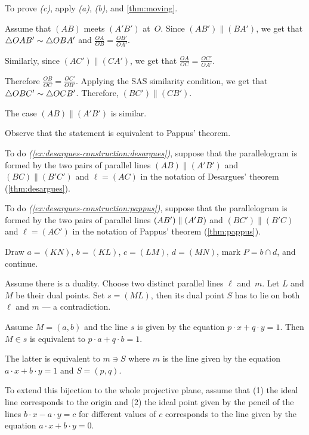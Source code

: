 \begin{multicols}{2}
To prove \textit{(c)}, apply \textit{(a)}, \textit{(b)}, and \ref{thm:moving}.

Assume that $(AB)$ meets $(A'B')$ at~$O$.
Since $(AB')\parallel (BA')$, we get that $\triangle OAB'\z\sim\triangle OBA'$
and
$\frac{OA}{OB}=\frac{OB'}{OA'}$.

Similarly, since $(AC')\parallel (CA')$, we get that
$\frac{OA}{OC}=\frac{OC'}{OA'}$.

Therefore
$\frac{OB}{OC}=\frac{OC'}{OB'}$.
Applying the SAS similarity condition, we get that
$\triangle OBC'\z\sim\triangle OCB'$.
Therefore, $(BC')\parallel (CB')$.

The case $(AB)\parallel(A'B')$ is similar.

 Observe that the statement is equivalent to Pappus' theorem.

To do \textit{(\ref{ex:desargues-construction:desargues})}, 
suppose that the parallelogram is formed by the two pairs of parallel lines $(AB)\parallel (A'B')$ and $(BC)\parallel(B'C')$ and $\ell=(AC)$ in the notation of Desargues' theorem (\ref{thm:desargues}).

To do \textit{(\ref{ex:desargues-construction:pappus})}, suppose that the parallelogram is formed by the two pairs of parallel lines $(AB')\z\parallel (A'B)$ and $(BC')\parallel(B'C)$ and $\ell=(AC')$ in the notation of Pappus' theorem (\ref{thm:pappus}).

Draw $a=(KN)$, $b=(KL)$, $c=(LM)$, $d=(MN)$, mark $P=b\cap d$, and continue. 

Assume there is a duality.
Choose two distinct parallel lines $\ell$ and~$m$.
Let $L$ and $M$ be their dual points.
Set $s=(ML)$, then its dual point $S$ has to lie on both $\ell$ and $m$ --- a contradiction.

Assume $M=(a,b)$ 
and the line $s$ is given by the equation $p\cdot x+q\cdot y=1$.
Then $M\in s$ is equivalent to $p\cdot a+q\cdot b=1$.

The latter is equivalent to $m\ni S$
where $m$ is the line given by the equation 
$a\cdot x+b\cdot y=1$ and $S=(p,q)$.

To extend this bijection to the whole projective plane, assume that 
(1) the ideal line corresponds to the origin 
and (2) the ideal point given by the pencil of the lines $b\cdot x-a\cdot y=c$ for different values of $c$ corresponds to the line given by the equation $a\cdot x+b\cdot y=0$.



\end{multicols}
